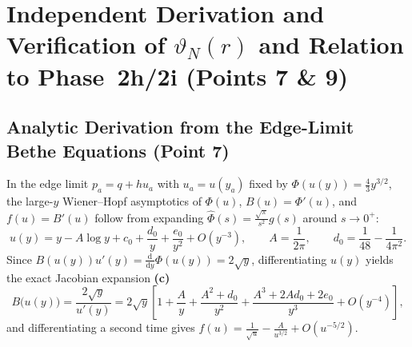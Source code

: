 \documentclass[11pt,a4paper]{article}
\newcommand{\dd}{\mathrm{d}}
\begin{document}
\section{Independent Derivation and Verification of \texorpdfstring{$\vartheta_N(r)$}{vartheta\_N(r)} and Relation to Phase~2h/2i (Points 7 \& 9)}
\label{sec:vartheta}

\subsection{Analytic Derivation from the Edge-Limit Bethe Equations (Point 7)}

In the edge limit $p_a=q+h u_a$ with $u_a=u(y_a)$ fixed by $\Phi(u(y))=\frac{4}{3}y^{3/2}$, the large-$y$ Wiener--Hopf asymptotics of $\Phi(u)$, $B(u)=\Phi'(u)$, and $f(u)=B'(u)$ follow from expanding $\widehat{\Phi}(s)=\frac{\sqrt{\pi}}{s^2}g(s)$ around $s\to 0^+$:
\begin{equation}\label{eq:1body_asy}
  u(y) = y - A\log y + c_0 + \frac{d_0}{y} + \frac{e_0}{y^2} + O(y^{-3}), \qquad A = \frac{1}{2\pi}, \qquad d_0 = \frac{1}{48} - \frac{1}{4\pi^2}.
\end{equation}
Since $B(u(y))u'(y)=\frac{\dd}{\dd y}\Phi(u(y))=2\sqrt{y}$, differentiating $u(y)$ yields the exact Jacobian expansion \textbf{(c)}
\begin{equation}\label{eq:B_jacobian}
  B\bigl(u(y)\bigr) = \frac{2\sqrt{y}}{u'(y)} = 2\sqrt{y}\left[1 + \frac{A}{y} + \frac{A^2+d_0}{y^2} + \frac{A^3+2Ad_0+2e_0}{y^3} + O(y^{-4})\right],
\end{equation}
and differentiating a second time gives $f(u)=\frac{1}{\sqrt{u}}-\frac{A}{u^{3/2}}+O(u^{-5/2})$.
\end{document}
